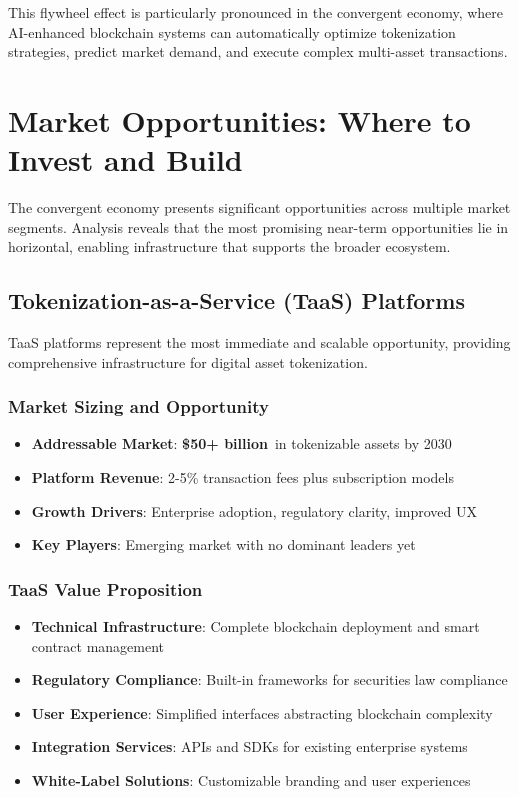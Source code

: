 \documentclass[11pt,a4paper]{report}
\newcommand{\marketvalue}[2]{\textcolor{trust}{\textbf{\$#1}}\,\textcolor{darkgray}{#2}}
\begin{document}
This flywheel effect is particularly pronounced in the convergent economy, where AI-enhanced blockchain systems can automatically optimize tokenization strategies, predict market demand, and execute complex multi-asset transactions.

\chapter{Market Opportunities: Where to Invest and Build}

The convergent economy presents significant opportunities across multiple market segments. Analysis reveals that the most promising near-term opportunities lie in horizontal, enabling infrastructure that supports the broader ecosystem.

\section{Tokenization-as-a-Service (TaaS) Platforms}

TaaS platforms represent the most immediate and scalable opportunity, providing comprehensive infrastructure for digital asset tokenization.

\subsection{Market Sizing and Opportunity}

\begin{marketfigure}
\begin{itemize}
    \item \textbf{Addressable Market}: \marketvalue{50+ billion}{} in tokenizable assets by 2030
    \item \textbf{Platform Revenue}: 2-5\% transaction fees plus subscription models
    \item \textbf{Growth Drivers}: Enterprise adoption, regulatory clarity, improved UX
    \item \textbf{Key Players}: Emerging market with no dominant leaders yet
\end{itemize}
\end{marketfigure}

\subsection{TaaS Value Proposition}

\begin{itemize}
    \item \textbf{Technical Infrastructure}: Complete blockchain deployment and smart contract management
    \item \textbf{Regulatory Compliance}: Built-in frameworks for securities law compliance
    \item \textbf{User Experience}: Simplified interfaces abstracting blockchain complexity
    \item \textbf{Integration Services}: APIs and SDKs for existing enterprise systems
    \item \textbf{White-Label Solutions}: Customizable branding and user experiences
\end{itemize}
\end{document}
